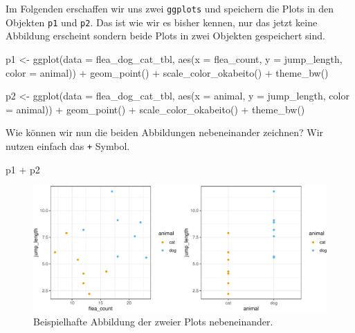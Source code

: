 \documentclass[
  letterpaper,
]{scrbook}
\newenvironment{Shaded}{\begin{snugshade}}{\end{snugshade}}
\newcommand{\AttributeTok}[1]{\textcolor[rgb]{0.40,0.45,0.13}{#1}}
\newcommand{\FunctionTok}[1]{\textcolor[rgb]{0.28,0.35,0.67}{#1}}
\newcommand{\NormalTok}[1]{\textcolor[rgb]{0.00,0.23,0.31}{#1}}
\newcommand{\OtherTok}[1]{\textcolor[rgb]{0.00,0.23,0.31}{#1}}
\newcommand{\SpecialCharTok}[1]{\textcolor[rgb]{0.37,0.37,0.37}{#1}}
\begin{document}
Im Folgenden erschaffen wir uns zwei \texttt{ggplots} und speichern die
Plots in den Objekten \texttt{p1} und \texttt{p2}. Das ist wie wir es
bisher kennen, nur das jetzt keine Abbildung erscheint sondern beide
Plots in zwei Objekten gespeichert sind.

\begin{Shaded}
\begin{Highlighting}[]
\NormalTok{p1 }\OtherTok{\textless{}{-}} \FunctionTok{ggplot}\NormalTok{(}\AttributeTok{data =}\NormalTok{ flea\_dog\_cat\_tbl, }
             \FunctionTok{aes}\NormalTok{(}\AttributeTok{x =}\NormalTok{ flea\_count, }\AttributeTok{y =}\NormalTok{ jump\_length,}
                 \AttributeTok{color =}\NormalTok{ animal)) }\SpecialCharTok{+}
  \FunctionTok{geom\_point}\NormalTok{() }\SpecialCharTok{+}
  \FunctionTok{scale\_color\_okabeito}\NormalTok{() }\SpecialCharTok{+}
  \FunctionTok{theme\_bw}\NormalTok{()}

\NormalTok{p2 }\OtherTok{\textless{}{-}} \FunctionTok{ggplot}\NormalTok{(}\AttributeTok{data =}\NormalTok{ flea\_dog\_cat\_tbl, }
                \FunctionTok{aes}\NormalTok{(}\AttributeTok{x =}\NormalTok{ animal, }\AttributeTok{y =}\NormalTok{ jump\_length,}
                    \AttributeTok{color =}\NormalTok{ animal)) }\SpecialCharTok{+}
  \FunctionTok{geom\_point}\NormalTok{() }\SpecialCharTok{+}
  \FunctionTok{scale\_color\_okabeito}\NormalTok{() }\SpecialCharTok{+}
  \FunctionTok{theme\_bw}\NormalTok{()}
\end{Highlighting}
\end{Shaded}

Wie können wir nun die beiden Abbildungen nebeneinander zeichnen? Wir
nutzen einfach das \texttt{+} Symbol.

\begin{Shaded}
\begin{Highlighting}[]
\NormalTok{p1 }\SpecialCharTok{+}\NormalTok{ p2}
\end{Highlighting}
\end{Shaded}

\begin{figure}[H]

{\centering \includegraphics{./eda-ggplot_files/figure-pdf/fig-labels-patchwork-1-1.pdf}

}

\caption{\label{fig-labels-patchwork-1}Beispielhafte Abbildung der
zweier Plots nebeneinander.}

\end{figure}
\end{document}
